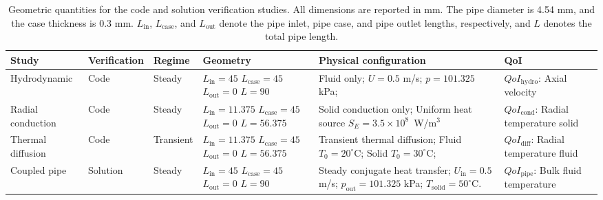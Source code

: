 
\begin{table}[htbp]
    \centering
    \caption{Geometric quantities for the code and solution verification studies. All dimensions are reported in mm. The pipe diameter is 4.54 mm, and the case thickness is 0.3 mm. \(L_{\mathrm{in}}\), \(L_{\mathrm{case}}\), and \(L_{\mathrm{out}}\) denote the pipe inlet, pipe case, and pipe outlet lengths, respectively, and \(L\) denotes the total pipe length.}
    \begin{tabular}{P{2.4cm}P{1.8cm}P{1.4cm}P{2.4cm}P{3.6cm}P{3.6cm}}
        \toprule
        Study & Verification & Regime & Geometry & Physical configuration & QoI \\
        \midrule        
        Hydrodynamic
        & Code
        & Steady
        & $L_{\mathrm{in}}=45$\newline
          $L_{\mathrm{case}}=45$\newline
          $L_{\mathrm{out}}=0$\newline
          $L=90$ 
        & Fluid only; 
          $U=0.5$ m/s;
          $p=101.325$ kPa;
        & 
          $QoI_{\mathrm{hydro}}$: Axial velocity \\
        
        \midrule
        Radial conduction
        & Code
        & Steady
        & $L_{\mathrm{in}}=11.375$\newline
          $L_{\mathrm{case}}=45$\newline
          $L_{\mathrm{out}}=0$\newline
          $L=56.375$
        & Solid conduction only; Uniform heat source $S_E=3.5\times10^{8}$~W/m$^3$ &  
          $QoI_{\mathrm{cond}}$: Radial temperature solid \\
        
        \midrule
        Thermal diffusion
        & Code
        & Transient
        & $L_{\mathrm{in}}=11.375$\newline
          $L_{\mathrm{case}}=45$\newline
          $L_{\mathrm{out}}=0$\newline
          $L=56.375$
        & Transient thermal diffusion;
          Fluid $T_0=20^\circ$C;
          Solid $T_0=30^\circ$C;
        & 
          $QoI_{\mathrm{diff}}$: Radial temperature fluid \\
        
        \midrule
        Coupled pipe
        & Solution
        & Steady
        & $L_{\mathrm{in}}=45$\newline
          $L_{\mathrm{case}}=45$\newline
          $L_{\mathrm{out}}=0$\newline
          $L=90$
        & Steady conjugate heat transfer;
          $U_{\mathrm{in}}=0.5$ m/s;
          $p_{\mathrm{out}}=101.325$ kPa;
          $T_{\text{solid}}=50^\circ$C.
        & 
          $QoI_{\mathrm{pipe}}$: Bulk fluid temperature \\
        

\end{tabular}
\end{table}
